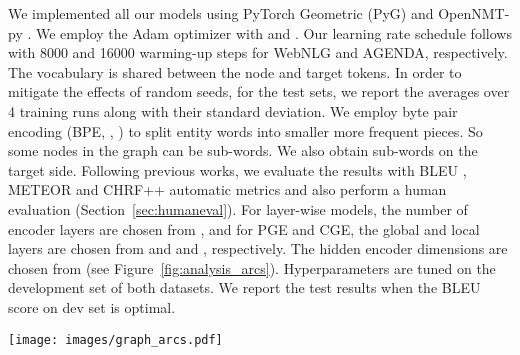 \documentclass[11pt,a4paper]{article}
\begin{document}
We implemented all our models using PyTorch Geometric (PyG) \cite{Fey/Lenssen/2019} and \mbox{OpenNMT-py} \cite{opennmt}. We employ the Adam optimizer with  and . Our learning rate schedule follows \citet{NIPS2017_7181} with 8000 and 16000 warming-up steps for WebNLG and AGENDA, respectively. The vocabulary is shared between the node and target tokens. In order to mitigate the effects of random seeds, for the test sets, we report the averages over 4 training runs along with their standard deviation. We employ byte pair encoding (BPE, \citeauthor{sennrich-etal-2016-neural}, \citeyear{sennrich-etal-2016-neural}) to split entity words into smaller more frequent pieces. So some nodes in the graph can be sub-words. We also obtain sub-words on the target side. Following previous works, we evaluate the results with BLEU \cite{Papineni:2002:BMA:1073083.1073135}, METEOR \cite{Denkowski14meteoruniversal} and CHRF++ \cite{popovic-2015-chrf} automatic metrics and also perform a human evaluation (Section~\ref{sec:humaneval}). For layer-wise models, the number of encoder layers are chosen from , and for {\selectfont PGE} and {\selectfont CGE}, the global and local layers are chosen from and  and , respectively. The hidden encoder dimensions are chosen from  (see Figure~\ref{fig:analysis_arcs}). Hyperparameters are tuned on the development set of both datasets. We report the test results when the BLEU score on dev set is optimal.


















 \begin{figure*}[t]
    \centering
    \texttt{[image: images/graph\_arcs.pdf]}
    \vspace{-7mm}
    \caption{BLEU scores for AGENDA dev set, with respect to (a) the encoder layers, (b) the encoder hidden dimensions and (c) the number of parameters.}
    \label{fig:analysis_arcs}
\end{figure*}
\end{document}
